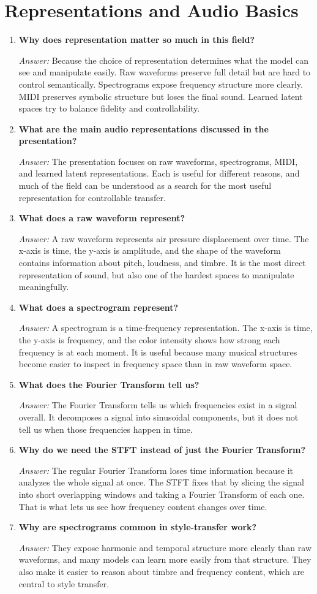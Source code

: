 \documentclass[11pt]{article}
\newcommand{\qa}[2]{
\item \textbf{#1}

\textit{Answer:} #2
}
\begin{document}
\section{Representations and Audio Basics}

\begin{enumerate}[start=9]
\qa{Why does representation matter so much in this field?}{
Because the choice of representation determines what the model can see and manipulate easily. Raw waveforms preserve full detail but are hard to control semantically. Spectrograms expose frequency structure more clearly. MIDI preserves symbolic structure but loses the final sound. Learned latent spaces try to balance fidelity and controllability.
}

\qa{What are the main audio representations discussed in the presentation?}{
The presentation focuses on raw waveforms, spectrograms, MIDI, and learned latent representations. Each is useful for different reasons, and much of the field can be understood as a search for the most useful representation for controllable transfer.
}

\qa{What does a raw waveform represent?}{
A raw waveform represents air pressure displacement over time. The x-axis is time, the y-axis is amplitude, and the shape of the waveform contains information about pitch, loudness, and timbre. It is the most direct representation of sound, but also one of the hardest spaces to manipulate meaningfully.
}

\qa{What does a spectrogram represent?}{
A spectrogram is a time-frequency representation. The x-axis is time, the y-axis is frequency, and the color intensity shows how strong each frequency is at each moment. It is useful because many musical structures become easier to inspect in frequency space than in raw waveform space.
}

\qa{What does the Fourier Transform tell us?}{
The Fourier Transform tells us which frequencies exist in a signal overall. It decomposes a signal into sinusoidal components, but it does not tell us when those frequencies happen in time.
}

\qa{Why do we need the STFT instead of just the Fourier Transform?}{
The regular Fourier Transform loses time information because it analyzes the whole signal at once. The STFT fixes that by slicing the signal into short overlapping windows and taking a Fourier Transform of each one. That is what lets us see how frequency content changes over time.
}

\qa{Why are spectrograms common in style-transfer work?}{
They expose harmonic and temporal structure more clearly than raw waveforms, and many models can learn more easily from that structure. They also make it easier to reason about timbre and frequency content, which are central to style transfer.
}


\end{enumerate}
\end{document}
